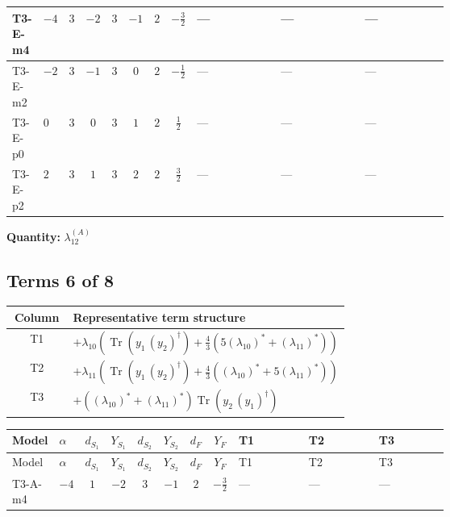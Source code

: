 \documentclass[8pt]{article}
\begin{document}
\begin{landscape}
\begin{longtable}{@{}llcccccc >{\raggedright\arraybackslash}p{0.21\linewidth} >{\raggedright\arraybackslash}p{0.21\linewidth} >{\raggedright\arraybackslash}p{0.21\linewidth}@{}}
\midrule
T3-E-m4 & $-4$ & $3$ & $-2$ & $3$ & $-1$ & $2$ & $-\frac{3}{2}$ & --- & --- & --- \\
\midrule
T3-E-m2 & $-2$ & $3$ & $-1$ & $3$ & $0$ & $2$ & $-\frac{1}{2}$ & --- & --- & --- \\
\midrule
T3-E-p0 & $0$ & $3$ & $0$ & $3$ & $1$ & $2$ & $\frac{1}{2}$ & --- & --- & --- \\
\midrule
T3-E-p2 & $2$ & $3$ & $1$ & $3$ & $2$ & $2$ & $\frac{3}{2}$ & --- & --- & --- \\
\midrule
\bottomrule
\end{longtable}
\clearpage
\noindent\textbf{Quantity: }$\lambda_{12}^{(A)}$\par\smallskip
\subsection*{Terms 6 of 8}
\begin{center}
\begin{tabular}{@{}c >{\raggedright\arraybackslash}p{0.82\linewidth}@{}}
\toprule
Column & Representative term structure \\
\midrule
T1 & \(\displaystyle +{\lambda_{10}} \left(\operatorname{Tr}\!\left({y_1}\,\left({y_2}\right)^{\dagger}\right)+\frac{4}{3} (5 \left({\lambda_{10}}\right)^{*}+\left({\lambda_{11}}\right)^{*})\right)\) \\
\midrule
T2 & \(\displaystyle +{\lambda_{11}} \left(\operatorname{Tr}\!\left({y_1}\,\left({y_2}\right)^{\dagger}\right)+\frac{4}{3} (\left({\lambda_{10}}\right)^{*}+5 \left({\lambda_{11}}\right)^{*})\right)\) \\
\midrule
T3 & \(\displaystyle +(\left({\lambda_{10}}\right)^{*}+\left({\lambda_{11}}\right)^{*}) \operatorname{Tr}\!\left({y_2}\,\left({y_1}\right)^{\dagger}\right)\) \\
\midrule
\bottomrule
\end{tabular}
\end{center}
\smallskip
\tiny
\begin{longtable}{@{}llcccccc >{\raggedright\arraybackslash}p{0.21\linewidth} >{\raggedright\arraybackslash}p{0.21\linewidth} >{\raggedright\arraybackslash}p{0.21\linewidth}@{}}
\toprule
Model & $\alpha$ & $d_{S_1}$ & $Y_{S_1}$ & $d_{S_2}$ & $Y_{S_2}$ & $d_F$ & $Y_F$ & T1 & T2 & T3 \\
\midrule
\endfirsthead
\toprule
Model & $\alpha$ & $d_{S_1}$ & $Y_{S_1}$ & $d_{S_2}$ & $Y_{S_2}$ & $d_F$ & $Y_F$ & T1 & T2 & T3 \\
\midrule
\endhead
T3-A-m4 & $-4$ & $1$ & $-2$ & $3$ & $-1$ & $2$ & $-\frac{3}{2}$ & --- & --- & --- \\

\end{longtable}
\end{landscape}
\end{document}
